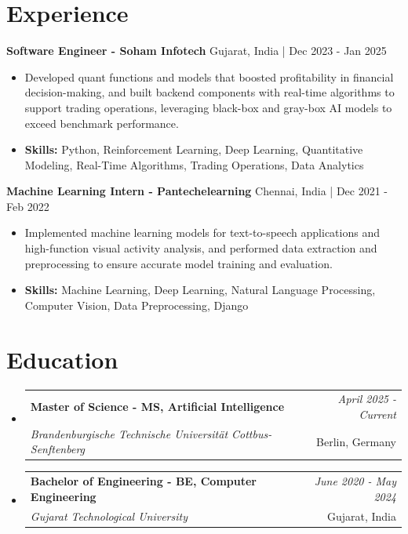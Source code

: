 \documentclass[a4paper,11pt]{article}
\makeatletter
\newcommand{\resumeSubheading}[4]{
\vspace{0.5mm}\item
    \begin{tabular*}{0.98\textwidth}[t]{l@{\extracolsep{\fill}}r}
        \textbf{#1} & \textit{\footnotesize{#4}} \\
        \textit{\footnotesize{#3}} &  \footnotesize{#2}\\
    \end{tabular*}
    \vspace{-2.4mm}
}
\makeatother
\begin{document}
\section{\textbf{Experience}}


\vspace{1mm}
  \textbf{Software Engineer - Soham Infotech} \hfill Gujarat, India | Dec 2023 - Jan 2025
\vspace{-1.5mm} %
\begin{itemize}
  \item Developed quant functions and models that boosted profitability in financial decision-making, and built backend components with real-time algorithms to support trading operations, leveraging black-box and gray-box AI models to exceed benchmark performance.

\vspace{-2mm}
  \item \textbf{Skills:} Python, Reinforcement Learning, Deep Learning, Quantitative Modeling, Real-Time Algorithms, Trading Operations, Data Analytics
\end{itemize}

\vspace{1mm}
  \textbf{Machine Learning Intern - Pantechelearning} \hfill Chennai, India | Dec 2021 - Feb 2022
\vspace{-1.5mm} %
\begin{itemize}
  \item Implemented machine learning models for text-to-speech applications and high-function visual activity analysis, and performed data extraction and preprocessing to ensure accurate model training and evaluation.
\vspace{-2mm}
  \item \textbf{Skills:} Machine Learning, Deep Learning, Natural Language Processing, Computer Vision, Data Preprocessing, Django
\end{itemize}\section{\textbf{Education}}
\vspace{-0.4mm}

\begin{itemize}
\resumeSubheading
{Master of Science - MS, Artificial Intelligence }{Berlin, Germany}
{Brandenburgische Technische Universität Cottbus-Senftenberg  }{April 2025 - Current}

\vspace{1.0mm} %
\resumeSubheading
{Bachelor of Engineering - BE, Computer Engineering  }{Gujarat, India}
{Gujarat Technological University }{June 2020 - May 2024}

\end{itemize}
\end{document}
